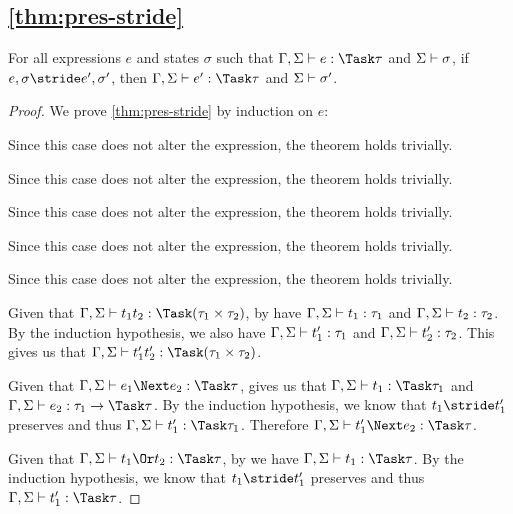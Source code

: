 \subsection{\cref{thm:pres-stride}}

\begin{lemma}
  For all expressions $e$ and states $\sigma$
  such that $\Gamma,\Sigma \infers e:\Task\tau$ and $\Sigma \vdash \sigma$,
  if $e,\sigma \stride e',\sigma'$,
  then $\Gamma,\Sigma \infers e':\Task\tau$ and $\Sigma \vdash \sigma'$.
  \label{thm:pres-stride}
\end{lemma}

\begin{proof}
  We prove \cref{thm:pres-stride} by induction on $e$:

     {Since this case does not alter the expression, the theorem holds trivially.}

     {Since this case does not alter the expression, the theorem holds trivially.}

     {Since this case does not alter the expression, the theorem holds trivially.}

     {Since this case does not alter the expression, the theorem holds trivially.}

     {Since this case does not alter the expression, the theorem holds trivially.}

     {Given that $\Gamma,\Sigma\infers t_1\And t_2:\Task(\tau_1\times\tau_2)$, by  have $\Gamma,\Sigma\vdash t_1:\tau_1$ and $\Gamma,\Sigma\vdash t_2:\tau_2$.
     By the induction hypothesis, we also have $\Gamma,\Sigma\vdash t_1':\tau_1$ and $\Gamma,\Sigma\vdash t_2':\tau_2$.
     This gives us that $\Gamma,\Sigma\infers t_1'\And t_2':\Task(\tau_1\times\tau_2)$.}

       {Given that
  $\Gamma,\Sigma\infers e_1\Next e_2:\Task \tau$,  gives us that $\Gamma,\Sigma\infers t_1:\Task\tau_1$ and
  $\Gamma,\Sigma\infers e_2:\tau_1 \to \Task \tau$. By the induction hypothesis,
  we know that $t_1\stride t_1'$ preserves and thus
  $\Gamma,\Sigma\infers t_1':\Task\tau_1$. Therefore
  $\Gamma,\Sigma\infers t_1'\Next e_2:\Task\tau$.}

       {Given that
  $\Gamma,\Sigma\infers t_1\Or t_2:\Task\tau$, by  we have
  $\Gamma,\Sigma\infers t_1:\Task\tau$. By the induction hypothesis, we know that
  $t_1\stride t_1'$ preserves and thus $\Gamma,\Sigma\infers t_1':\Task\tau$.}


\end{proof}
